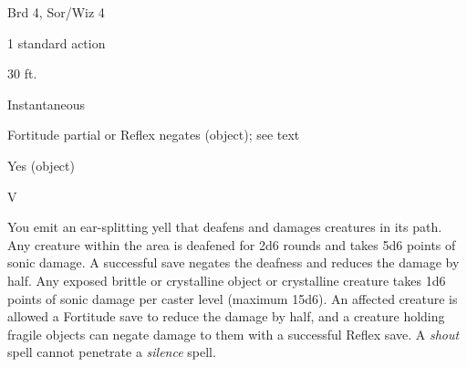 
\begin{description*}
\item[Level:] Brd 4, Sor/Wiz 4
\item[Casting Time:] 1 standard action
\item[Range:] 30 ft.
\item[Duration:] Instantaneous
\item[Saving Throw:] Fortitude partial or Reflex negates (object); see text
\item[Spell Resistance:] Yes (object)
\item[Components:] V
\end{description*}

You emit an ear-splitting yell that deafens and damages creatures in its path.
Any creature within the area is deafened for 2d6 rounds and takes 5d6 points of
sonic damage. A successful save negates the deafness and reduces the damage by
half. Any exposed brittle or crystalline object or crystalline creature takes 1d6
points of sonic damage per caster level (maximum 15d6). An affected creature is
allowed a Fortitude save to reduce the damage by half, and a creature holding fragile
objects can negate damage to them with a successful Reflex save.
A \textit{shout} spell cannot penetrate a \textit{silence} spell.